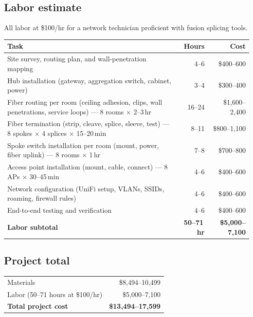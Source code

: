 \documentclass[]{anvil-proposal}
\begin{document}
\subsection{Labor estimate}

All labor at \$100/hr for a network technician proficient with fusion splicing tools.

\begin{metricbox}
\begin{tabularx}{\textwidth}{@{} X r r @{}}
\toprule
\textbf{Task} & \textbf{Hours} & \textbf{Cost} \\
\midrule
Site survey, routing plan, and wall-penetration mapping & 4--6 & \$400--600 \\
Hub installation (gateway, aggregation switch, cabinet, power) & 3--4 & \$300--400 \\
Fiber routing per room (ceiling adhesion, clips, wall penetrations, service loops) --- 8 rooms $\times$ 2--3\,hr & 16--24 & \$1,600--2,400 \\
Fiber termination (strip, cleave, splice, sleeve, test) --- 8 spokes $\times$ 4 splices $\times$ 15--20\,min & 8--11 & \$800--1,100 \\
Spoke switch installation per room (mount, power, fiber uplink) --- 8 rooms $\times$ 1\,hr & 7--8 & \$700--800 \\
Access point installation (mount, cable, connect) --- 8 APs $\times$ 30--45\,min & 4--6 & \$400--600 \\
Network configuration (UniFi setup, VLANs, SSIDs, roaming, firewall rules) & 4--6 & \$400--600 \\
End-to-end testing and verification & 4--6 & \$400--600 \\
\midrule
\textbf{Labor subtotal} & \textbf{50--71\,hr} & \textbf{\$5,000--7,100} \\
\bottomrule
\end{tabularx}
\end{metricbox}

\subsection{Project total}

\begin{metricbox}
\begin{tabularx}{\textwidth}{@{} X r @{}}
\toprule
Materials & \$8,494--10,499 \\
Labor (50--71 hours at \$100/hr) & \$5,000--7,100 \\
\midrule
\textbf{Total project cost} & \textbf{\$13,494--17,599} \\
\bottomrule
\end{tabularx}
\end{metricbox}
\end{document}
